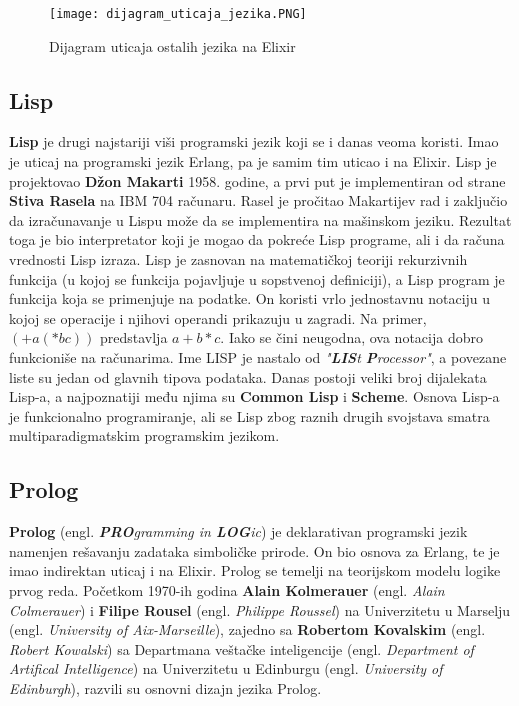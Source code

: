 \documentclass[12pt,oneside]{memoir}
\begin{document}
\begin{figure}[!ht]
  \centering
  \texttt{[image: dijagram\_uticaja\_jezika.PNG]}
  \caption{Dijagram uticaja ostalih jezika na Elixir}
  \label{fig:02}
\end{figure}

\newpage

\subsection{Lisp}
\textbf{Lisp} je drugi najstariji viši programski jezik koji se i danas veoma koristi. Imao je uticaj na programski jezik Erlang, pa je samim tim uticao i na Elixir. Lisp je projektovao \textbf{Džon Makarti} 1958. godine, a prvi put je implementiran od strane \textbf{Stiva Rasela} na IBM 704 računaru. Rasel je pročitao Makartijev rad i zaključio da izračunavanje u Lispu može da se implementira na mašinskom jeziku. Rezultat toga je bio  interpretator koji je mogao da pokreće Lisp programe, ali i da računa vrednosti Lisp izraza. Lisp je zasnovan na matematičkoj teoriji rekurzivnih funkcija (u kojoj se funkcija pojavljuje u sopstvenoj definiciji), a Lisp program je funkcija koja se primenjuje na podatke. On koristi vrlo jednostavnu notaciju u kojoj se operacije i njihovi operandi prikazuju u zagradi. Na primer, $(+ a ( * b c))$ predstavlja $a + b * c$. Iako se čini neugodna, ova notacija dobro funkcioniše na računarima. Ime LISP je nastalo od \textit{"\textbf{LIS}t \textbf{P}rocessor"}, a povezane liste su jedan od glavnih tipova podataka. Danas postoji veliki broj dijalekata Lisp-a, a najpoznatiji među njima su \textbf{Common Lisp} i \textbf{Scheme}. Osnova Lisp-a je funkcionalno programiranje, ali se Lisp zbog raznih drugih svojstava smatra multiparadigmatskim programskim jezikom.

\subsection{Prolog}
\textbf{Prolog} (engl. \textit{\textbf{PRO}gramming in \textbf{LOG}ic}) je deklarativan programski jezik namenjen rešavanju zadataka simboličke prirode. On bio osnova za Erlang, te je imao indirektan uticaj i na Elixir. Prolog se temelji na teorijskom modelu logike prvog reda. Početkom 1970-ih godina \textbf{Alain Kolmerauer} (engl. \textit{Alain Colmerauer}) i \textbf{Filipe Rousel} (engl. \textit{Philippe Roussel}) na Univerzitetu u Marselju (engl. \textit{University of Aix-Marseille}), zajedno sa \textbf{Robertom Kovalskim} (engl. \textit{Robert Kowalski}) sa Departmana veštačke inteligencije (engl. \textit{Department of Artifical Intelligence}) na Univerzitetu u Edinburgu (engl. \textit{University of Edinburgh}), razvili su osnovni dizajn jezika Prolog.
\end{document}
